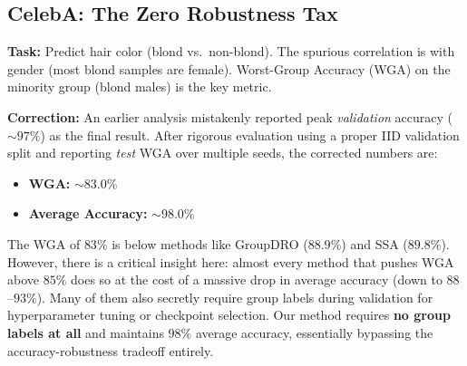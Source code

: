 \documentclass[11pt,a4paper]{article}
\begin{document}
\subsection{CelebA: The Zero Robustness Tax}

\textbf{Task:} Predict hair color (blond vs.\ non-blond). The spurious correlation is with gender (most blond samples are female). Worst-Group Accuracy (WGA) on the minority group (blond males) is the key metric.

\textbf{Correction:} An earlier analysis mistakenly reported peak \emph{validation} accuracy ($\sim97\%$) as the final result. After rigorous evaluation using a proper IID validation split and reporting \emph{test} WGA over multiple seeds, the corrected numbers are:

\begin{itemize}
    \item \textbf{WGA:} $\sim83.0\%$
    \item \textbf{Average Accuracy:} $\sim98.0\%$
\end{itemize}

The WGA of $83\%$ is below methods like GroupDRO ($88.9\%$) and SSA ($89.8\%$). However, there is a critical insight here: almost every method that pushes WGA above $85\%$ does so at the cost of a massive drop in average accuracy (down to $88$--$93\%$). Many of them also secretly require group labels during validation for hyperparameter tuning or checkpoint selection. Our method requires \textbf{no group labels at all} and maintains $98\%$ average accuracy, essentially bypassing the accuracy-robustness tradeoff entirely.
\end{document}

